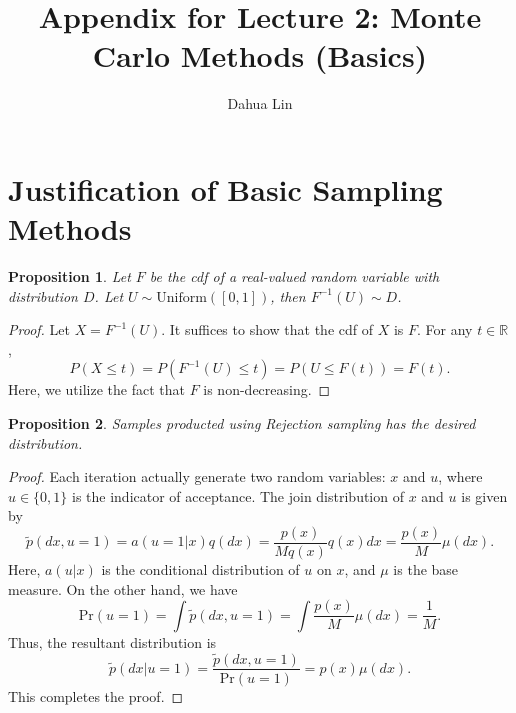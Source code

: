 \documentclass[a4paper,11pt]{article}
\newtheorem{proposition}{Proposition}
\newcommand{\pr}{\mathrm{Pr}}
\newcommand{\tp}{\tilde{p}}
\newcommand{\rsp}{\mathbb{R}}
\newcommand{\unif}{\mathrm{Uniform}}
\begin{document}
\title{Appendix for Lecture 2: Monte Carlo Methods (Basics)}
\author{Dahua Lin}
\date{}
\maketitle

\section{Justification of Basic Sampling Methods}

\begin{proposition}
    Let $F$ be the cdf of a real-valued random variable with distribution $D$. Let $U \sim \unif([0, 1])$, then $F^{-1}(U) \sim D$.
\end{proposition}

\begin{proof}
    Let $X = F^{-1}(U)$. It suffices to show that the cdf of $X$ is $F$. For any $t \in \rsp$,
    \begin{equation}
        P(X \le t) = P(F^{-1}(U) \le t) = P(U \le F(t)) = F(t).
    \end{equation}
    Here, we utilize the fact that $F$ is non-decreasing. 
\end{proof}

\begin{proposition}
    Samples producted using Rejection sampling has the desired distribution.
\end{proposition}

\begin{proof}
    Each iteration actually generate two random variables: $x$ and $u$, where $u \in \{0, 1\}$ is the indicator of acceptance. 
    The join distribution of $x$ and $u$ is given by 
    \begin{equation}
        \tp(dx, u = 1) = a(u = 1 | x) q(dx) = \frac{p(x)}{M q(x)} q(x) dx = \frac{p(x)}{M} \mu(dx).
    \end{equation}
    Here, $a(u | x)$ is the conditional distribution of $u$ on $x$, and $\mu$ is the base measure. 
    On the other hand, we have
    \begin{equation}
        \pr(u = 1) = \int \tp(dx, u=1) = \int \frac{p(x)}{M} \mu(dx) = \frac{1}{M}.
    \end{equation}
    Thus, the resultant distribution is
    \begin{equation}
        \tp(dx | u = 1) = \frac{\tp(dx, u=1)}{\pr(u = 1)} = p(x) \mu(dx).
    \end{equation}
    This completes the proof.
\end{proof}
\end{document}
